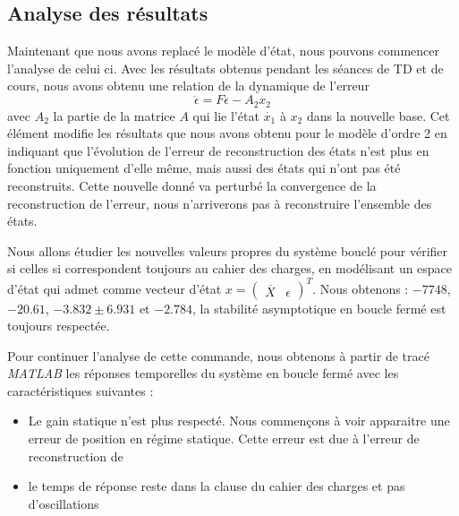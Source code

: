 \subsection{Analyse des résultats}
Maintenant que nous avons replacé le modèle d'état, nous pouvons commencer l'analyse de celui ci. Avec les résultats obtenus pendant les séances de TD et de cours, nous avons obtenu une relation de la dynamique de l'erreur \begin{equation}\label{eqn:erreurRecompoOrdreSup}
\dot{\epsilon} = F\epsilon - A_2x_2
\end{equation}
avec $A_2$ la partie de la matrice $A$ qui lie l'état $\dot{x_1}$ à $x_2$ dans la nouvelle base. Cet élément modifie les résultats que nous avons obtenu pour le modèle d'ordre 2 en indiquant que l'évolution de l'erreur de reconstruction des états n'est plus en fonction uniquement d'elle même, mais aussi des états qui n'ont pas été reconstruits. Cette nouvelle donné va perturbé la convergence de la reconstruction de l'erreur, nous n'arriverons pas à reconstruire l'ensemble des états. 


Nous allons étudier les nouvelles valeurs propres du système bouclé pour vérifier si celles si correspondent toujours au cahier des charges, en modélisant un espace d'état qui admet comme vecteur d'état $x=\begin{pmatrix}
\overline{X}&\epsilon \end{pmatrix}^T$. Nous obtenons : $-7748$, $-20.61$, $ -3.832 \pm 6.931$ et $-2.784$, la stabilité asymptotique en boucle fermé est toujours respectée.



Pour continuer l'analyse de cette commande, nous obtenons à partir de tracé \emph{MATLAB} les réponses temporelles du système en boucle fermé avec les caractéristiques suivantes : \begin{itemize}
\item Le gain statique n'est plus respecté. Nous commençons à voir apparaitre une erreur de position en régime statique. Cette erreur est due à l'erreur de reconstruction de 
\item le temps de réponse reste dans la clause du cahier des charges et pas d'oscillations
\end{itemize} 


